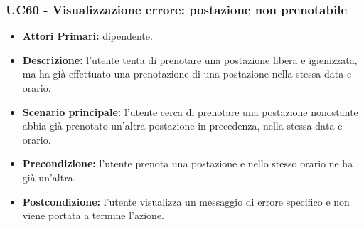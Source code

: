 \subsubsection{ UC60 - Visualizzazione errore: postazione non prenotabile }
\begin{itemize}
	\item\textbf{Attori Primari:} dipendente.
	\item\textbf{Descrizione:} l’utente tenta di prenotare una postazione libera e igienizzata, ma ha già effettuato una prenotazione di una postazione nella stessa data e orario.
	\item\textbf{Scenario principale:} l'utente cerca di prenotare una postazione nonostante abbia già prenotato un'altra postazione in precedenza, nella stessa data e orario.
	\item\textbf{Precondizione:} l'utente prenota una postazione e nello stesso orario ne ha già un'altra.
	\item\textbf{Postcondizione:} l’utente visualizza un messaggio di errore specifico e non viene portata a termine l’azione.
\end{itemize}

